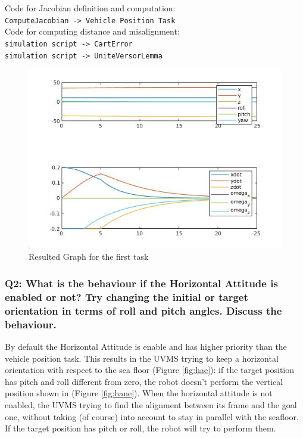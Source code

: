 \documentclass{article}
\begin{document}
\colorbox{mygray}{\parbox{0.9\textwidth}{
Code for Jacobian definition and computation: \\
\texttt{ComputeJacobian -> Vehicle Position Task}\\
Code for computing distance and misalignment: \\
\texttt{simulation script -> CartError} \\
\texttt{simulation script -> UniteVersorLemma}
}}

\begin{figure}[!h]
    \centering
    \includegraphics[scale=0.5]{111_ppdot.jpg}
    \caption{Resulted Graph for the first task}
    \label{graph_1_1}
\end{figure}

\subsubsection{Q2: What is the behaviour if the Horizontal Attitude is enabled or not? Try changing the initial or target orientation in terms of roll and pitch angles. Discuss the behaviour.} 
By default the Horizontal Attitude is enable and has higher priority than the vehicle position task. This results in the UVMS trying to keep a horizontal orientation with respect to the sea floor (Figure  \ref{fig:hae}): if the target position has pitch and roll different from zero, the robot doesn’t perform the vertical position shown in (Figure  \ref{fig:hane}).
When the horizontal attitude is not enabled, the UVMS trying to find the alignment between its frame and the goal one, without taking (of course) into account to stay in parallel with the seafloor. If the target position has pitch or roll, the robot will try to perform them.
\end{document}
